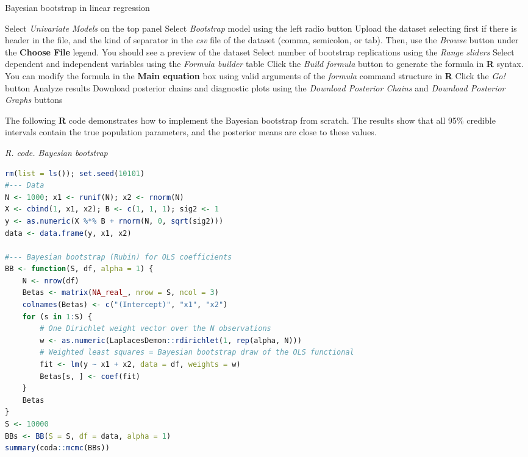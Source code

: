 \begin{algorithm}[h!]
	\caption{Bayesian bootstrap in linear regression}\label{alg:BayBootstrap}
	\begin{algorithmic}[1]  		 			
		\State Select \textit{Univariate Models} on the top panel
		\State Select \textit{Bootstrap} model using the left radio button
		\State Upload the dataset selecting first if there is header in the file, and the kind of separator in the \textit{csv} file of the dataset (comma, semicolon, or tab). Then, use the \textit{Browse} button under the \textbf{Choose File} legend. You should see a preview of the dataset
		\State Select number of bootstrap replications using the \textit{Range sliders}
		\State Select dependent and independent variables using the \textit{Formula builder} table
		\State Click the \textit{Build formula} button to generate the formula in \textbf{R} syntax. You can modify the formula in the \textbf{Main equation} box using valid arguments of the \textit{formula} command structure in \textbf{R}
		\State Click the \textit{Go!} button
		\State Analyze results
		\State Download posterior chains and diagnostic plots using the \textit{Download Posterior Chains} and \textit{Download Posterior Graphs} buttons
	\end{algorithmic} 
\end{algorithm}

The following \textbf{R} code demonstrates how to implement the Bayesian bootstrap from scratch. The results show that all 95\% credible intervals contain the true population parameters, and the posterior means are close to these values.

\begin{tcolorbox}[enhanced,width=4.67in,center upper,
	fontupper=\large\bfseries,drop shadow southwest,sharp corners]
	\textit{R. code. Bayesian bootstrap}
	\begin{VF}
		\begin{lstlisting}[language=R]
rm(list = ls()); set.seed(10101)
#--- Data
N <- 1000; x1 <- runif(N); x2 <- rnorm(N)
X <- cbind(1, x1, x2); B <- c(1, 1, 1); sig2 <- 1
y <- as.numeric(X %*% B + rnorm(N, 0, sqrt(sig2)))
data <- data.frame(y, x1, x2)

#--- Bayesian bootstrap (Rubin) for OLS coefficients
BB <- function(S, df, alpha = 1) {
	N <- nrow(df)
	Betas <- matrix(NA_real_, nrow = S, ncol = 3)
	colnames(Betas) <- c("(Intercept)", "x1", "x2")
	for (s in 1:S) {
		# One Dirichlet weight vector over the N observations
		w <- as.numeric(LaplacesDemon::rdirichlet(1, rep(alpha, N)))
		# Weighted least squares = Bayesian bootstrap draw of the OLS functional
		fit <- lm(y ~ x1 + x2, data = df, weights = w)
		Betas[s, ] <- coef(fit)
	}
	Betas
}
S <- 10000
BBs <- BB(S = S, df = data, alpha = 1)
summary(coda::mcmc(BBs))
\end{lstlisting}
	\end{VF}
\end{tcolorbox} 
 
